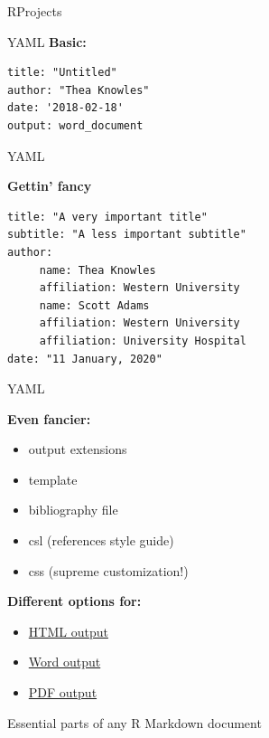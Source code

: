 \documentclass[
  ignorenonframetext,
]{beamer}
\providecommand{\tightlist}{%
  \setlength{\itemsep}{0pt}\setlength{\parskip}{0pt}}
\begin{document}
\begin{frame}[fragile]{RProjects}
\begin{block}{YAML}
\textbf{Basic: }

\begin{verbatim}
title: "Untitled"
author: "Thea Knowles"
date: '2018-02-18'
output: word_document
\end{verbatim}

\end{block}

\begin{block}{YAML}

\textbf{Gettin' fancy}

\begin{verbatim}
title: "A very important title"
subtitle: "A less important subtitle"
author:
     name: Thea Knowles
     affiliation: Western University
     name: Scott Adams
     affiliation: Western University
     affiliation: University Hospital
date: "11 January, 2020"
\end{verbatim}

\end{block}

\begin{block}{YAML}

\textbf{Even fancier:}

\begin{itemize}
\tightlist
\item
  output extensions
\item
  template
\item
  bibliography file
\item
  csl (references style guide)
\item
  css (supreme customization!)
\end{itemize}

\textbf{Different options for:}

\begin{itemize}
\tightlist
\item
  \href{https://rmarkdown.rstudio.com/html_document_format.html}{HTML
  output}
\item
  \href{https://rmarkdown.rstudio.com/word_document_format.html}{Word
  output}
\item
  \href{https://rmarkdown.rstudio.com/pdf_document_format.html}{PDF
  output}
\end{itemize}

\end{block}

\begin{block}{Essential parts of any R Markdown document}


\end{block}
\end{frame}
\end{document}
